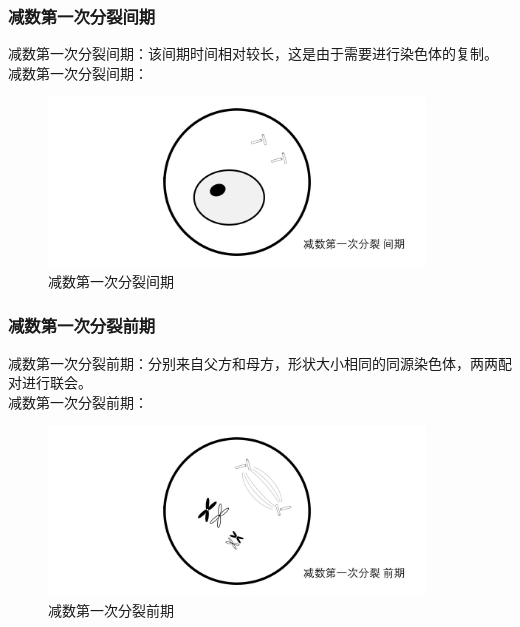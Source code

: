 \documentclass[UTF8]{ctexart}
\begin{document}
\subsubsection{减数第一次分裂间期}
    减数第一次分裂间期：该间期时间相对较长，这是由于需要进行染色体的复制。\\[4mm]
    减数第一次分裂间期：
    \begin{figure}[h]
        \begin{center}
            \includegraphics[width=10cm]{BiologyImage/34.jpg}
            \caption{减数第一次分裂间期}
        \end{center}
    \end{figure}

\subsubsection{减数第一次分裂前期}
    减数第一次分裂前期：分别来自父方和母方，形状大小相同的同源染色体，两两配对进行联会。\\[4mm]
    减数第一次分裂前期：
    \begin{figure}[h]
        \begin{center}
            \includegraphics[width=10cm]{BiologyImage/35.jpg}
            \caption{减数第一次分裂前期}
        \end{center}
    \end{figure}

\newpage
\end{document}
